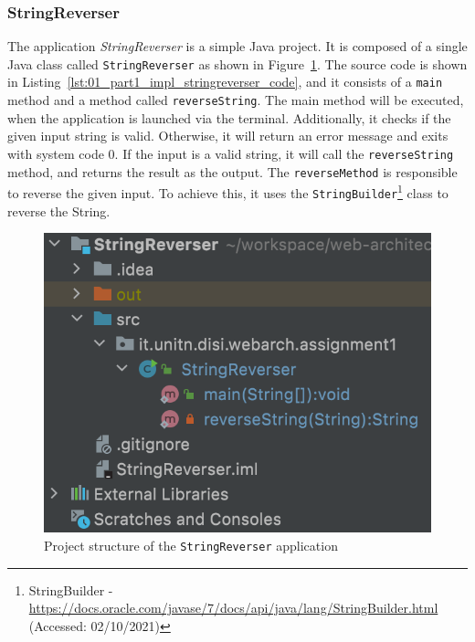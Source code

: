 \documentclass{article}
\def\Fig#1{Figure~\ref{#1}}
\def\Lst#1{Listing~\ref{#1}}
\begin{document}
\subsubsection{StringReverser}\label{subsubsec:01_part1_impl_stringreverser}
The application \textit{StringReverser} is a simple Java project. It is composed of a single Java class called \texttt{StringReverser} as shown in \Fig{fig:01_part1_impl_stringreverser_structure}.
The source code is shown in \Lst{lst:01_part1_impl_stringreverser_code}, and it consists of a \texttt{main} method and a method called \texttt{reverseString}.
The main method will be executed, when the application is launched via the terminal. Additionally, it checks if the given input string is valid. Otherwise, it will return an error message and exits with system code 0. If the input is a valid string, it will call the \texttt{reverseString} method, and returns the result as the output.
The \texttt{reverseMethod} is responsible to reverse the given input. To achieve this, it uses the \texttt{StringBuilder}\footnote{StringBuilder - \url{https://docs.oracle.com/javase/7/docs/api/java/lang/StringBuilder.html} (Accessed: 02/10/2021)} class to reverse the String.

\begin{figure}[h]
\centering
\includegraphics[scale=0.4]{images/StringReverserStrct}
\caption{Project structure of the \texttt{StringReverser} application}
\label{fig:01_part1_impl_stringreverser_structure}
\end{figure}
\end{document}
